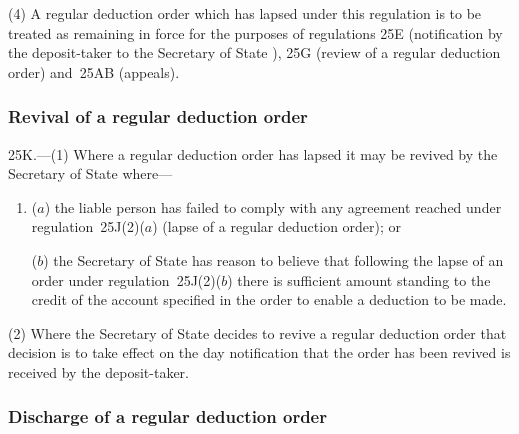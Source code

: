 \documentclass[12pt,a4paper]{article}
\begin{document}
(4) A regular deduction order which has lapsed under this regulation is to be treated as remaining in force for the purposes of regulations 25E (notification by the deposit-taker to the 
Secretary of State%
), 25G (review of a regular deduction order) and~25AB (appeals).


\subsubsection[25K. Revival of a regular deduction order]{Revival of a regular deduction order}

25K.---(1)  Where a regular deduction order has lapsed it may be revived by the 
Secretary of State  %
where—
\begin{enumerate}\item[]
($a$) the liable person has failed to comply with any agreement reached under regulation~25J(2)($a$)  (lapse of a regular deduction order); or

($b$) the 
Secretary of State  %
has reason to believe that following the lapse of an order under regulation~25J(2)($b$)  there is sufficient amount standing to the credit of the account specified in the order to enable a deduction to be made.
\end{enumerate}

(2) Where the 
Secretary of State  %
decides to revive a regular deduction order that decision is to take effect on the day notification that the order has been revived is received by the deposit-taker.


\subsubsection[25L. Discharge of a regular deduction order]{Discharge of a regular deduction order}
\end{document}
